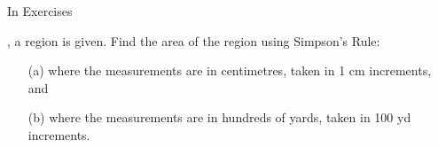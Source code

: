 {\noindent In Exercises}
{, a region is given. Find the area of the region using Simpson's Rule:
\begin{enumerate}
\item	[(a)] where the measurements are in centimetres, taken in 1 cm increments, and
\item	[(b)] where the measurements are in hundreds of yards, taken in 100 yd increments.
\end{enumerate}
}
